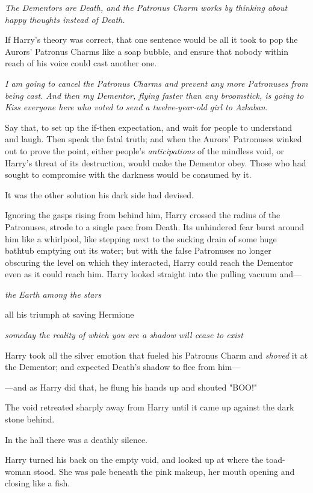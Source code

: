 \emph{The Dementors are Death, and the Patronus Charm works by thinking about 
happy thoughts instead of Death.}

If Harry's theory was correct, that one sentence would be all it took to pop 
the Aurors' Patronus Charms like a soap bubble, and ensure that nobody within 
reach of his voice could cast another one.

\emph{I am going to cancel the Patronus Charms and prevent any more Patronuses 
from being cast. And then my Dementor, flying faster than any broomstick, is 
going to Kiss everyone here who voted to send a twelve-year-old girl to 
Azkaban.}

Say that, to set up the if-then expectation, and wait for people to understand 
and laugh. Then speak the fatal truth; and when the Aurors' Patronuses winked 
out to prove the point, either people's \emph{anticipations} of the mindless 
void, or Harry's threat of its destruction, would make the Dementor obey. Those 
who had sought to compromise with the darkness would be consumed by it.

It was the other solution his dark side had devised.

Ignoring the gasps rising from behind him, Harry crossed the radius of the 
Patronuses, strode to a single pace from Death. Its unhindered fear burst 
around him like a whirlpool, like stepping next to the sucking drain of some 
huge bathtub emptying out its water; but with the false Patronuses no longer 
obscuring the level on which they interacted, Harry could reach the Dementor 
even as it could reach him. Harry looked straight into the pulling vacuum and---

\emph{the Earth among the stars}

all his triumph at saving Hermione

\emph{someday the reality of which you are a shadow will cease to exist}

Harry took all the silver emotion that fueled his Patronus Charm and 
\emph{shoved} it at the Dementor; and expected Death's shadow to flee from 
him---

---and as Harry did that, he flung his hands up and shouted "BOO!"

The void retreated sharply away from Harry until it came up against the dark 
stone behind.

In the hall there was a deathly silence.

Harry turned his back on the empty void, and looked up at where the toad-woman 
stood. She was pale beneath the pink makeup, her mouth opening and closing like 
a fish.

